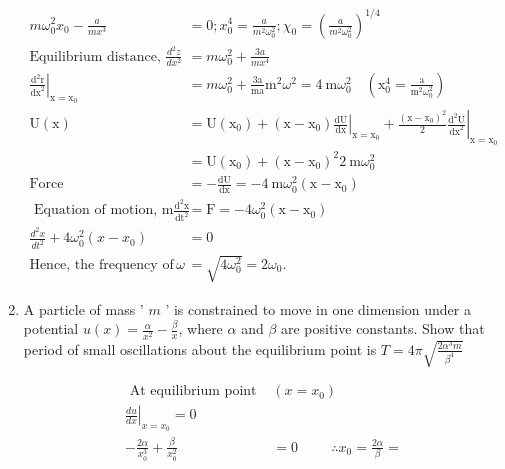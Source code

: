 \begin{enumerate}
\begin{answer}
\begin{align*}
		m \omega_{0}^{2} x_{0}-\frac{a}{m x^{3}}&=0 ; x_{0}^{4}=\frac{a}{m^{2} \omega_{0}^{2}} ; \chi_{0}=\left(\frac{a}{m^{2} \omega_{0}^{2}}\right)^{1 / 4}\\
		\text{Equilibrium distance, }\frac{d^{2} z}{d x^{2}}&=m \omega_{0}^{2}+\frac{3 a}{m x^{4}}\\
		\left.\frac{\mathrm{d}^{2} \mathrm{r}}{\mathrm{dx}^{2}}\right|_{\mathrm{x}=\mathrm{x}_{0}}&=m \omega_{0}^{2}+\frac{3 \mathrm{a}}{\mathrm{ma}} \mathrm{m}^{2} \omega^{2}=4 \mathrm{~m} \omega_{0}^{2} \quad\left(\mathrm{x}_{0}^{4}=\frac{\mathrm{a}}{\mathrm{m}^{2} \omega_{0}^{2}}\right)\\
		\mathrm{U}(\mathrm{x})&=\mathrm{U}\left(\mathrm{x}_{0}\right)+\left.\left(\mathrm{x}-\mathrm{x}_{0}\right) \frac{\mathrm{dU}}{\mathrm{dx}}\right|_{\mathrm{x}=\mathrm{x}_{0}}+\left.\frac{\left(\mathrm{x}-\mathrm{x}_{0}\right)^{2}}{2} \frac{\mathrm{d}^{2} \mathrm{U}}{\mathrm{dx}^{2}}\right|_{\mathrm{x}=\mathrm{x}_{0}}\\
		&=\mathrm{U}\left(\mathrm{x}_{0}\right)+\left(\mathrm{x}-\mathrm{x}_{0}\right)^{2} 2 \mathrm{~m} \omega_{0}^{2}\\
		\text{Force }&=-\frac{\mathrm{dU}}{\mathrm{dx}}=-4 \mathrm{~m} \omega_{0}^{2}\left(\mathrm{x}-\mathrm{x}_{0}\right)\\
	\text{	Equation of motion, }\mathrm{m} \frac{\mathrm{d}^{2} \mathrm{x}}{\mathrm{dt}^{2}}&=\mathrm{F}=-4 \omega_{0}^{2}\left(\mathrm{x}-\mathrm{x}_{0}\right)\\
		\frac{d^{2} x}{d t^{2}}+4 \omega_{0}^{2}\left(x-x_{0}\right)&=0\\
		\text{Hence, the frequency of small oscillation, }\omega&=\sqrt{4 \omega_{0}^{2}}=2 \omega_{0}.
		\end{align*}
	\end{answer}
	\item A particle of mass ' $m$ ' is constrained to move in one dimension under a potential $u(x)=\frac{\alpha}{x^{2}}-\frac{\beta}{x}$, where $\alpha$ and $\beta$ are positive constants. Show that period of small oscillations about the equilibrium point is
	$T=4 \pi \sqrt{\frac{2 \alpha^{3} m}{\beta^{4}}}$
	\begin{answer}
		\begin{align*}
	\text{	At equilibrium point }&\left(x=x_{0}\right)\\
		\left.\frac{d u}{d x}\right|_{x=x_{0}}=0 \\
		-\frac{2 \alpha}{x_{0}^{3}}+\frac{\beta}{x_{0}^{2}}&=0
		\hspace{1cm}\therefore x_{0}=\frac{2 \alpha}{\beta}=

\end{align*}
\end{answer}
\end{enumerate}
